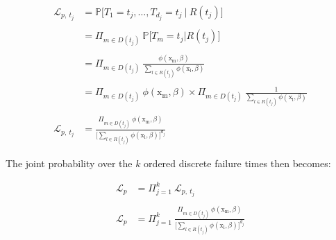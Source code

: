 \documentclass[
]{book}
\begin{document}
\begin{equation}
\begin{aligned}
  \mathcal{L}_{p,\ t_j} & = \mathbb{P}\big[T_1 = t_j, \dots, T_{d_j} = t_j \ | \ R(t_j)\big] \\\\
  & = \Pi_{m \in D(t_j)} \ \mathbb{P}\big[T_m = t_j | R(t_j) \big] \\\\
  & = \Pi_{m \in D(t_j)} \ \frac{\phi(\mathrm{x_m}, \beta)}{\sum_{l \in R(t_j)} \phi(\mathrm{x_l}, \beta)} \\\\
  & = \Pi_{m \in D(t_j)} \ \phi(\mathrm{x_m}, \beta) \times \Pi_{m \in D(t_j)} \ \frac{1}{\sum_{l \in R(t_j)} \phi(\mathrm{x_l}, \beta)} \\\\
  \mathcal{L}_{p,\ t_j} & = \frac{\Pi_{m \in D(t_j)} \ \phi(\mathrm{x_m}, \beta)}{\Big[\sum_{l \in R(t_j)} \phi(\mathrm{x_l}, \beta)\Big]^{d_j}}
\end{aligned}
\label{eq:partlikproof}
\end{equation}

The joint probability over the \(k\) ordered discrete failure times then becomes:

\begin{equation}
\begin{aligned}
  \mathcal{L}_p & = \Pi_{j=1}^{k} \ \mathcal{L}_{p,\ t_j} \\\\
  \mathcal{L}_p & = \Pi_{j=1}^{k} \ \frac{\Pi_{m \in D(t_j)} \ \phi(\mathrm{x_m}, \beta)}{\Big[\sum_{l \in R(t_j)} \phi(\mathrm{x_l}, \beta)\Big]^{d_j}}
\end{aligned}
\label{eq:partlikproofbis}
\end{equation}

  
\end{document}
